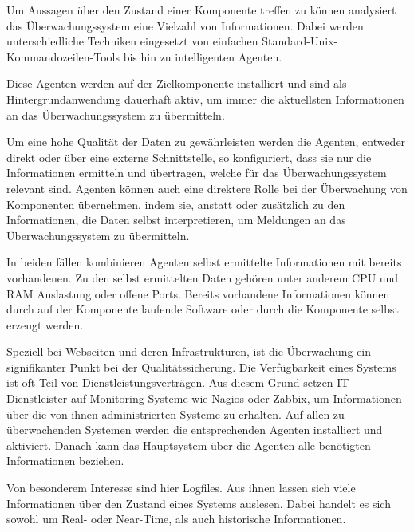 Um Aussagen über den Zustand einer Komponente treffen zu können analysiert das Überwachungssystem eine Vielzahl von Informationen. Dabei werden unterschiedliche Techniken eingesetzt von einfachen Standard-Unix-Kommandozeilen-Tools bis hin zu intelligenten Agenten.

Diese Agenten werden auf der Zielkomponente installiert und sind als Hintergrundanwendung dauerhaft aktiv, um immer die aktuellsten Informationen an das Überwachungssystem zu übermitteln.

Um eine hohe Qualität der Daten zu gewährleisten werden die Agenten, entweder direkt oder über eine externe Schnittstelle, so konfiguriert, dass sie nur die Informationen ermitteln und übertragen, welche für das Überwachungssystem relevant sind. Agenten können auch eine direktere Rolle bei der Überwachung von Komponenten übernehmen, indem sie, anstatt oder zusätzlich zu den Informationen, die Daten selbst interpretieren, um Meldungen an das Überwachungssystem zu übermitteln.

In beiden fällen kombinieren Agenten selbst ermittelte Informationen mit bereits vorhandenen. Zu den selbst ermittelten Daten gehören unter anderem CPU und RAM Auslastung oder offene Ports. Bereits vorhandene Informationen können durch auf der Komponente laufende Software oder durch die Komponente selbst erzeugt werden.

Speziell bei Webseiten und deren Infrastrukturen, ist die Überwachung ein signifikanter Punkt bei der Qualitätssicherung. Die Verfügbarkeit eines Systems ist oft Teil von Dienstleistungsverträgen. Aus diesem Grund setzen IT-Dienstleister auf Monitoring Systeme wie \gls{Nagios} oder \gls{Zabbix}, um Informationen über die von ihnen administrierten Systeme zu erhalten. Auf allen zu überwachenden Systemen werden die entsprechenden Agenten installiert und aktiviert. Danach kann das Hauptsystem über die Agenten alle benötigten Informationen beziehen.

Von besonderem Interesse sind hier Logfiles. Aus ihnen lassen sich viele Informationen über den Zustand eines Systems auslesen. Dabei handelt es sich sowohl um Real- oder Near-Time, als auch historische Informationen.



